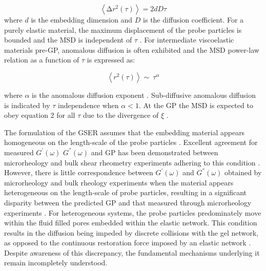 \documentclass[%
 aip,
 amsmath,amssymb,
reprint, onecolumn %
]{revtex4-1}
\begin{document}
\begin{equation}
\left\langle \mathrm{\Delta}r^{2}(\tau) \right\rangle = 2dD\tau
\end{equation}
where $d$ is the embedding dimension and $D$ is the diffusion coefficient. For a purely elastic material, the maximum displacement of the probe particles is bounded and the MSD is independent of $\tau$ \cite{Moschakis2013}. For intermediate viscoelastic materials pre-GP, anomalous diffusion is often exhibited and the MSD power-law relation as a function of $\tau$ is expressed as:

\begin{equation}
\left\langle r^{2}(\tau) \right\rangle \sim \ \tau^{\alpha}
\end{equation}

where $\alpha$ is the anomalous diffusion exponent \cite{Moschakis2013}. Sub-diffusive anomalous diffusion is indicated by {$ \tau$ independence} when $\alpha< 1$. At the GP the MSD is expected to obey equation 2 for all $\tau$ due to the divergence of $\xi$ \cite{Moschakis2013}.

The formulation of the GSER assumes that the embedding material appears homogeneous on the length-scale of the probe particles \cite{Mason1995,Mason2000,Oppong2006}. Excellent agreement for measured $G^{'}(\omega)$
$G^{''}(\omega)$ and GP has been demonstrated between microrheology and bulk shear rheometry experiments adhering to this condition \cite{Larsen2008,Dasgupta2002,Dasgupta2005}. However, there is little correspondence between $G^{'}(\omega)$ and $G^{''}(\omega)$ obtained by microrheology and bulk rheology experiments when the material appears heterogeneous on the length-scale of probe particles, resulting in a significant disparity between the predicted GP and that measured through microrheology experiments \cite{Rich2011,Oppong2006}. For heterogeneous systems, the probe particles predominately move within the fluid filled pores embedded within the elastic network. This condition results in the diffusion being impeded by discrete collisions with the gel network, as opposed to the continuous restoration force imposed by an elastic network \cite{Moschakis2013,deBruyn2013}. Despite awareness of this discrepancy, the fundamental mechanisms underlying it remain incompletely understood.
\end{document}
